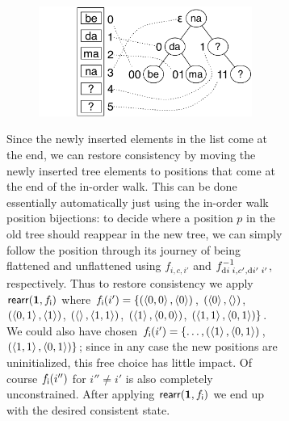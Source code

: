 \begin{figure}

\ifdissertation\begin{figure}
\else          \begin{figure}\hspace*{-4.3em}
\fi
\includegraphics[scale=.32]{images/restruct3.pdf}
\end{figure}
Since the newly inserted elements in the list come at the end, we can
restore consistency by moving the newly inserted tree elements to positions
that come at the end of the in-order walk. This can be done essentially
automatically just using the in-order walk position bijections: to decide
where a position $p$ in the old tree should reappear in the new tree, we can
simply follow the position through its journey of being flattened and
unflattened using $f_{i,c,i'}$ and $f_{\textrm{d} i\;i,c',\textrm{d} i'\;i'}^{-1}$,
respectively. Thus to restore consistency we apply $\mathsf{rearr}(\mbox{\bf{1}},f_{\mathsf{i}})$ where
$f_{\mathsf{i}}(i')=\{(\left<0,0\right>,\left<0\right>)$, $(\left<0\right>,\left<\right>)$,
$(\left<0,1\right>,\left<1\right>)$, $(\left<\right>,\left<1,1\right>)$,
$(\left<1\right>,\left<0,0\right>)$,
$(\left<1,1\right>,\left<0,1\right>)\}$. We could also have chosen
$f_{\mathsf{i}}(i')= \{\dots, (\left<1\right>,\left<0,1\right>)$,
$(\left<1,1\right>,\left<0,1\right>)\}$; since in any case the new
positions are uninitialized, this free choice has little impact.
Of course $f_{\mathsf{i}}(i'')$ for $i''\neq i'$ is also
completely unconstrained. After applying $\mathsf{rearr}(\mbox{\bf{1}},f_{\mathsf{i}})$ we end up
with the desired consistent state.


\end{figure}
\end{figure}
